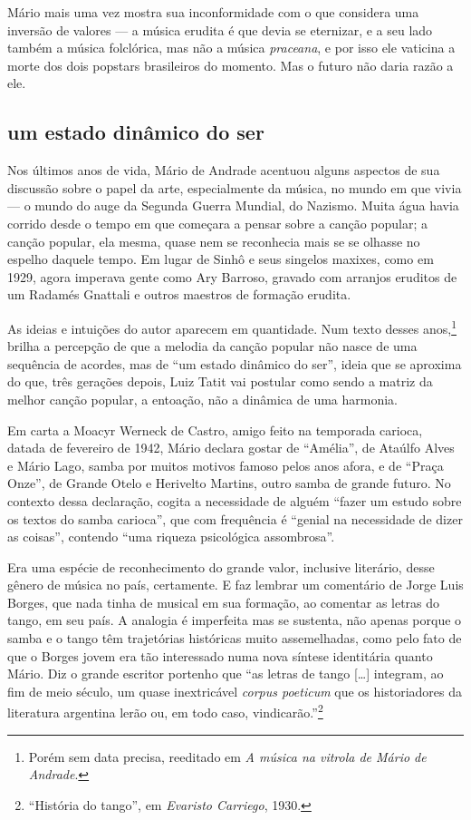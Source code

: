 Mário mais uma vez mostra sua inconformidade com o que considera uma
inversão de valores --- a música erudita é que devia se eternizar, e a
seu lado também a música folclórica, mas não a música \textit{praceana}, e
por isso ele vaticina a morte dos dois popstars brasileiros do momento.
Mas o futuro não daria razão a ele.

\subsection{um estado dinâmico do ser}

Nos últimos anos de vida, Mário de Andrade acentuou alguns aspectos de
sua discussão sobre o papel da arte, especialmente da música, no mundo
em que vivia --- o mundo do auge da Segunda Guerra Mundial, do Nazismo.
Muita água havia corrido desde o tempo em que começara a pensar sobre a
canção popular; a canção popular, ela mesma, quase nem se reconhecia
mais se se olhasse no espelho daquele tempo. Em lugar de Sinhô e seus
singelos maxixes, como em 1929, agora imperava gente como Ary Barroso,
gravado com arranjos eruditos de um Radamés Gnattali e outros maestros
de formação erudita.

As ideias e intuições do autor aparecem em quantidade. Num texto desses
anos,\footnote{Porém sem data precisa, reeditado em \textit{A música na vitrola de
Mário de Andrade}.} brilha a percepção de que a melodia da canção
popular não nasce de uma sequência de acordes, mas de ``um estado
dinâmico do ser'', ideia que se aproxima do que, três gerações depois,
Luiz Tatit vai postular como sendo a matriz da melhor canção popular, a
entoação, não a dinâmica de uma harmonia.

Em carta a Moacyr Werneck de Castro, amigo feito na temporada carioca,
datada de fevereiro de 1942, Mário declara gostar de ``Amélia'', de
Ataúlfo Alves e Mário Lago, samba por muitos motivos famoso pelos anos
afora, e de ``Praça Onze'', de Grande Otelo e Herivelto Martins, outro
samba de grande futuro. No contexto dessa declaração, cogita a
necessidade de alguém ``fazer um estudo sobre os textos do samba
carioca'', que com frequência é ``genial na necessidade de dizer as
coisas'', contendo ``uma riqueza psicológica assombrosa''.

Era uma espécie de reconhecimento do grande valor, inclusive literário,
desse gênero de música no país, certamente. E faz lembrar um comentário
de Jorge Luis Borges, que nada tinha de musical em sua formação, ao
comentar as letras do tango, em seu país. A analogia é imperfeita mas se
sustenta, não apenas porque o samba e o tango têm trajetórias históricas
muito assemelhadas, como pelo fato de que o Borges jovem era tão
interessado numa nova síntese identitária quanto Mário. Diz o grande
escritor portenho que ``as letras de tango {[}\ldots{}{]} integram, ao fim de
meio século, um quase inextricável \textit{corpus poeticum} que os
historiadores da literatura argentina lerão ou, em todo caso,
vindicarão.''\footnote{``História do tango'', em \textit{Evaristo Carriego}, 1930.}

